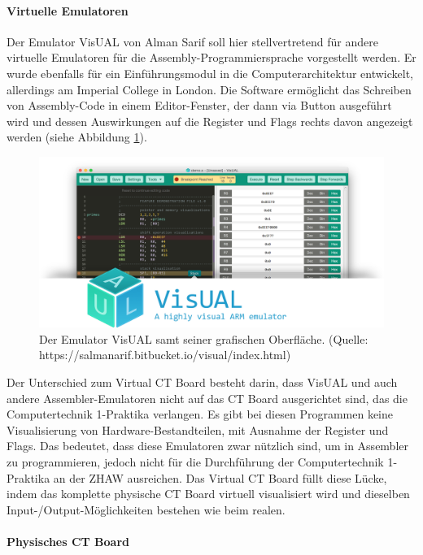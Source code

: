 \documentclass[10pt]{article}
\begin{document}
\paragraph{Virtuelle Emulatoren}
Der Emulator VisUAL von Alman Sarif soll hier stellvertretend für andere virtuelle Emulatoren für die Assembly-Programmiersprache vorgestellt werden. Er wurde ebenfalls für ein Einführungsmodul in die Computerarchitektur entwickelt, allerdings am Imperial College in London. Die Software ermöglicht das Schreiben von Assembly-Code in einem Editor-Fenster, der dann via Button ausgeführt wird und dessen Auswirkungen auf die Register und Flags rechts davon angezeigt werden (siehe Abbildung \ref{emulator}).
\begin{figure}[h]
\includegraphics[width=\textwidth]{visual_emulator}
\caption{Der Emulator VisUAL samt seiner grafischen Oberfläche. (Quelle: https://salmanarif.bitbucket.io/visual/index.html)}
\label{emulator}
\end{figure}
Der Unterschied zum \glqq Virtual CT Board\grqq{} besteht darin, dass VisUAL und auch andere Assembler-Emulatoren nicht auf das CT Board ausgerichtet sind, das die \glqq Computertechnik 1\grqq{}-Praktika verlangen. Es gibt bei diesen Programmen keine Visualisierung von Hardware-Bestandteilen, mit Ausnahme der Register und Flags. Das bedeutet, dass diese Emulatoren zwar nützlich sind, um in Assembler zu programmieren, jedoch nicht für die Durchführung der \glqq Computertechnik 1\grqq-Praktika an der ZHAW ausreichen. Das \glqq Virtual CT Board\grqq{} füllt diese Lücke, indem das komplette physische CT Board virtuell visualisiert wird und dieselben Input-/Output-Möglichkeiten bestehen wie beim realen.

\paragraph{Physisches CT Board} 
\end{document}
